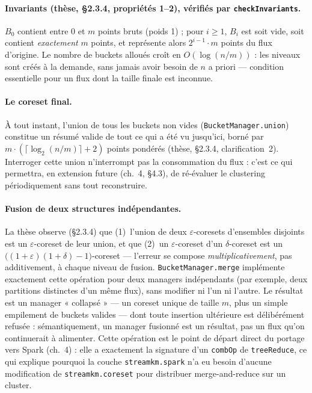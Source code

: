 \paragraph{Invariants (thèse, §2.3.4, propriétés 1--2), vérifiés par
\texttt{checkInvariants}.} $B_0$ contient entre 0 et $m$ points bruts (poids
1) ; pour $i \ge 1$, $B_i$ est soit vide, soit contient \emph{exactement} $m$
points, et représente alors $2^{i-1} \cdot m$ points du flux d'origine. Le
nombre de buckets alloués croît en $O(\log(n/m))$ : les niveaux sont créés
à la demande, sans jamais avoir besoin de $n$ a priori --- condition
essentielle pour un flux dont la taille finale est inconnue.

\paragraph{Le coreset final.} À tout instant, l'union de tous les buckets
non vides (\texttt{BucketManager.union}) constitue un résumé valide de tout
ce qui a été vu jusqu'ici, borné par $m \cdot (\lceil\log_2(n/m)\rceil + 2)$
points pondérés (thèse, §2.3.4, clarification~2). Interroger cette union
n'interrompt pas la consommation du flux : c'est ce qui permettra, en
extension future (ch.~4, §4.3), de ré-évaluer le clustering périodiquement
sans tout reconstruire.

\paragraph{Fusion de deux structures indépendantes.} La thèse observe
(§2.3.4) que (1)~l'union de deux $\varepsilon$-coresets d'ensembles disjoints
est un $\varepsilon$-coreset de leur union, et que (2)~un $\varepsilon$-coreset
d'un $\delta$-coreset est un $\big((1+\varepsilon)(1+\delta)-1\big)$-coreset ---
l'erreur se compose \emph{multiplicativement}, pas additivement, à chaque
niveau de fusion. \texttt{BucketManager.merge} implémente exactement cette
opération pour deux managers indépendants (par exemple, deux partitions
distinctes d'un même flux), sans modifier ni l'un ni l'autre. Le résultat est
un manager « collapsé » --- un coreset unique de taille $m$, plus un simple
empilement de buckets valides --- dont toute insertion ultérieure est
délibérément refusée : sémantiquement, un manager fusionné est un résultat,
pas un flux qu'on continuerait à alimenter. Cette opération est le point de
départ direct du portage vers Spark (ch.~4) : elle a exactement la signature
d'un \texttt{combOp} de \texttt{treeReduce}, ce qui explique pourquoi la
couche \texttt{streamkm.spark} n'a eu besoin d'aucune modification de
\texttt{streamkm.coreset} pour distribuer merge-and-reduce sur un cluster.
